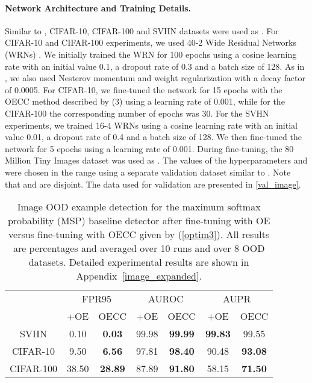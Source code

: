 \documentclass{article} \usepackage{iclr2020_conference,times}
\begin{document}
\paragraph{Network Architecture and Training Details.}  Similar to \cite{hendrycks2019oe}, CIFAR-10, CIFAR-100 and SVHN datasets were used as . For CIFAR-10 and CIFAR-100 experiments, we used 40-2 Wide Residual Networks (WRNs) \citep{BMVC2016_87}. We initially trained the WRN for 100 epochs using a cosine learning rate \citep{loshchilov-ICLR17SGDR} with an initial value 0.1, a dropout rate of 0.3 and a batch size of 128. As in \cite{hendrycks2019oe}, we also used Nesterov momentum and  weight regularization with a decay factor of 0.0005. For CIFAR-10, we fine-tuned the network for 15 epochs with the OECC method described by (3) using a learning rate of 0.001, while for the CIFAR-100 the corresponding number of epochs was 30. For the SVHN experiments, we trained 16-4 WRNs using a cosine learning rate with an initial value 0.01, a dropout rate of 0.4 and a batch size of 128. We then fine-tuned the network for 5 epochs using a learning rate of 0.001. During fine-tuning, the 80 Million Tiny Images dataset was used as . The values of the hyperparameters  and  were chosen in the range  using a separate validation dataset  similar to \cite{hendrycks2019oe}. Note that  and  are disjoint. The data used for validation are presented in \ref{val_image}.


\begin{table}[t]
\begin{center}
\begin{tabular}{c|cc|cc|cc}
\multicolumn{1}{c}{}&\multicolumn{2}{c}{FPR95}&\multicolumn{2}{c}{AUROC}&\multicolumn{2}{c}{AUPR}\\
\cline{2-7} 
&+OE&OECC&+OE&OECC&+OE&OECC\\
\hline
\multirow{1}{*}{{{SVHN}}}&0.10&\textbf{0.03}&99.98&\textbf{99.99}&\textbf{99.83}&99.55\\
\multirow{1}{*}{{{CIFAR-10}}}&9.50&\textbf{6.56}&97.81&\textbf{98.40}&90.48&\textbf{93.08}\\
\multirow{1}{*}{{{CIFAR-100}}}&38.50&\textbf{28.89}&87.89&\textbf{91.80}&58.15&\textbf{71.50}\\
\hline
\end{tabular}
\end{center}
\caption{\label{Image_OE_zipped_exp}Image OOD example detection for the maximum softmax probability (MSP) baseline detector after fine-tuning with OE \citep{hendrycks2019oe} versus fine-tuning with OECC given by (\ref{optim3}). All results are percentages and averaged over 10 runs and over 8 OOD datasets. Detailed experimental results are shown in Appendix~\ref{image_expanded}.}
\end{table}
\end{document}

